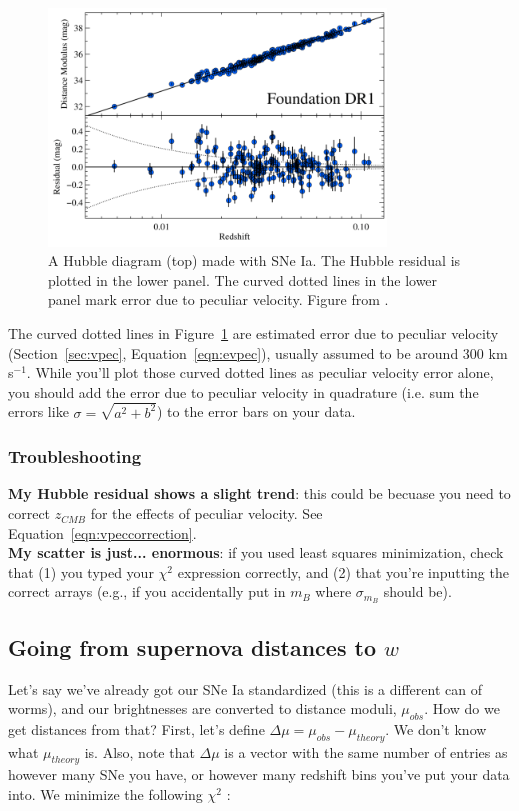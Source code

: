 \begin{figure}[h!]
    \centering
    \includegraphics[width=0.8\textwidth]{figs/hubble-resid.png}
    \caption{A Hubble diagram (top) made with SNe Ia. The Hubble residual is plotted in the lower panel. The curved dotted lines in the lower panel mark error due to peculiar velocity. Figure from \cite{Foley2017}.}
    \label{fig:hresid}
\end{figure}

The curved dotted lines in Figure~\ref{fig:hresid} are estimated error due to peculiar velocity (Section~\ref{sec:vpec}, Equation~\ref{eqn:evpec}), usually assumed to be around 300 km s$^{-1}$. While you'll plot those curved dotted lines as peculiar velocity error alone, you should add the error due to peculiar velocity in quadrature (i.e. sum the errors like $\sigma = \sqrt{a^{2} + b^{2}}$) to the error bars on your data. 

\subsubsection{Troubleshooting}
\textbf{My Hubble residual shows a slight trend}: this could be becuase you need to correct $z_{CMB}$ for the effects of peculiar velocity. See Equation~\ref{eqn:vpeccorrection}.\\

\noindent\textbf{My scatter is just... enormous}: if you used least squares minimization, check that (1) you typed your $\chi^{2}$ expression correctly, and (2) that you're inputting the correct arrays (e.g., if you accidentally put in $m_{B}$ where $\sigma_{m_{B}}$ should be). 

\subsection{Going from supernova distances to $w$}
Let's say we've already got our SNe Ia standardized (this is a different can of worms), and our brightnesses are converted to distance moduli, $\mu_{obs}$. How do we get distances from that? First, let's define $\Delta\mu = \mu_{obs}-\mu_{theory}$. We don't know what $\mu_{theory}$ is. Also, note that $\Delta\mu$ is a vector with the same number of entries as however many SNe you have, or however many redshift bins you've put your data into. We minimize the following $\chi^{2}$ \cite{conley2011}:


